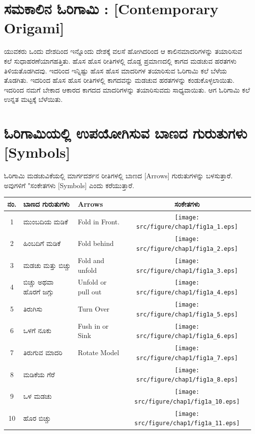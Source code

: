 
\section*{ಸಮಕಾಲಿನ ಓರಿಗಾಮಿ : [Contemporary Origami]}
ಯುವಕರು ಒಂದು ದೇಶದಿಂದ ಇನ್ನೊಂದು ದೇಶಕ್ಕೆ ವಲಸೆ ಹೋಗಿದರಿಂದ ಆ ಕಾಲಿನ\break ಮಾದರಿಗಳನ್ನು ತಯಾರಿಸುವ ಕಲೆ ಸುಧಾಹರಣೆಯಾಗಹತ್ತಿತು. ಹೊಸ ಹೊಸ ರೀತಿಗಳಲ್ಲಿ ದೊಡ್ಡ ಪ್ರಮಾಣದಲ್ಲಿ ಕಾಗದ ಮಡಚುವ ಹರತಗಳು ತಿಳಿಯತೊಡಗಿದವು. ಇದರಿಂದ ಇನ್ನಿಷ್ಟು ಹೊಸ ಹೊಸ  ಮಾದರಿಗಳ ತಯಾರಿಸುವ ಓರಿಗಾಮಿ ಕಲೆ ಬೆಳೆಯ ತೊಡಗಿತು. ಇದರಿಂದ ಹೊಸ ಹೊಸ ರೀತಿಗಳಲ್ಲಿ ಕಾಗದವನ್ನು ಮಡಚುವ ಹರತಗಳನ್ನು ಕಂಡುಕೊಳ್ಳಲಾಯಿತು. ಇದರಿಂದ ನಮಗೆ ಬೇಕಾದ ಆಕಾರದ ಕಾಗದದ ಮಾದರಿಗಳನ್ನು ತಯಾರಿಸುವದು ಸಾಧ್ಯ\break ವಾಯಿತು. ಆಗ ಓರಿಗಾಮಿ ಕಲೆ ಉನ್ನತ ಮಟ್ಟಕ್ಕೆ ಬೆಳೆಯಿತು. 


\section{ಓರಿಗಾಮಿಯಲ್ಲಿ ಉಪಯೋಗಿಸುವ ಬಾಣದ ಗುರುತುಗಳು [Symbols]}\label{sec1.3}%
ಓರಿಗಾಮಿ ಮಡಚುವಿಕೆಯಲ್ಲಿ ಮಾರ್ಗದರ್ಶನ ರೀತಿಗಳಲ್ಲಿ ಬಾಣದ [Arrows] ಗುರುತು\break ಗಳನ್ನು ಬಳಸುತ್ತಾರೆ. ಅವುಗಳಿಗೆ "ಸಂಕೇತಗಳು [Symbols] ಎಂದು ಕರೆಯುತ್ತಾರೆ. 

\medskip

\begin{longtable}[l]{|c|l|l|c|}
\hline
ನಂ.  & ಬಾಣದ ಗುರುತುಗಳು & Arrows & ಸಂಕೇತಗಳು \\[0.1cm]
\hline
1  & ಮುಂಬದಿಯ ಮಡಿಕೆ & Fold in Front. & {\texttt{[image: src/figure/chap1/fig1a\_1.eps]}}\\[0.1cm]
\hline
2 &ಹಿಂಬದಿಗೆ ಮಡಿಕೆ &  Fold behind & {\texttt{[image: src/figure/chap1/fig1a\_2.eps]}}\\[0.1cm]
\hline
3 & ಮಡಚು ಮತ್ತು ಬಿಚ್ಚು & Fold and unfold & {\texttt{[image: src/figure/chap1/fig1a\_3.eps]}}\\[0.1cm]
\hline
4 & ಬಿಚ್ಚು  ಅಥವಾ ಹೊರಗೆ ಜಗ್ಗು & Unfold or pull out & {\texttt{[image: src/figure/chap1/fig1a\_4.eps]}}\\[0.1cm]
\hline
5 & ತಿರುಗಿಸು & Turn Over & {\texttt{[image: src/figure/chap1/fig1a\_5.eps]}}\\[0.1cm]
\hline
6 & ಒಳಗೆ ನೂಕು & Fush in or Sink & {\texttt{[image: src/figure/chap1/fig1a\_6.eps]}}\\[0.1cm]
\hline
7 & ತಿರುಗುವ ಮಾದರಿ &  Rotate Model & {\texttt{[image: src/figure/chap1/fig1a\_7.eps]}}\\[0.1cm]
\hline
8 & ಮಡಿಕೆಯ ಗೆರೆ & & {\texttt{[image: src/figure/chap1/fig1a\_8.eps]}}\\[0.1cm]
\hline
9 & ಒಳ ಮಡಚು & & {\texttt{[image: src/figure/chap1/fig1a\_10.eps]}}\\[0.1cm]
\hline
10 & ಹೊರ ಬಿಚ್ಚು & & {\texttt{[image: src/figure/chap1/fig1a\_11.eps]}}\\[0.1cm]
\hline
\end{longtable}

